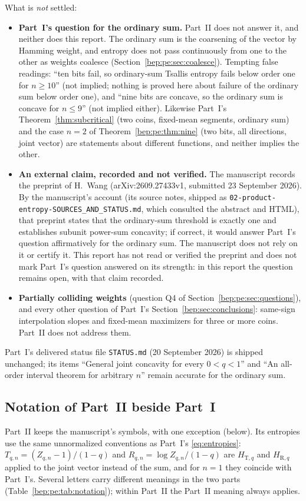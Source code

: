 \documentclass[11pt]{article}
\numberwithin{equation}{section}
\theoremstyle{definition}
\theoremstyle{remark}
\begin{document}
\noindent What is \emph{not} settled:
\begin{itemize}
\item \textbf{Part~I's question for the ordinary sum.} Part~II does not
answer it, and neither does this report. The ordinary sum is the
coarsening of the vector by Hamming weight, and entropy does not pass
continuously from one to the other as weights coalesce
(Section~\ref{bep:pe:sec:coalesce}). Tempting false readings: ``ten bits
fail, so ordinary-sum Tsallis entropy fails below order one for
$n\geq10$'' (not implied; nothing is proved here about failure of the
ordinary sum below order one), and ``nine bits are concave, so the
ordinary sum is concave for $n\leq9$'' (not implied either). Likewise
Part~I's Theorem~\ref{thm:subcritical} (two coins, fixed-mean segments,
ordinary sum) and the case $n=2$ of Theorem~\ref{bep:pe:thm:nine} (two
bits, all directions, joint vector) are statements about different
functions, and neither implies the other.
\item \textbf{An external claim, recorded and not verified.} The
manuscript records the preprint of H.~Wang \cite{bep:pe:Wang}
(arXiv:2609.27433v1, submitted 23 September 2026). By the manuscript's
account (its source notes, shipped as
\nolinkurl{02-product-entropy-SOURCES_AND_STATUS.md}, which consulted the
abstract and HTML), that preprint states that the ordinary-sum threshold
is exactly one and establishes subunit power-sum concavity; if correct, it
would answer Part~I's question affirmatively for the ordinary sum. The
manuscript does not rely on it or certify it. This report has not read or
verified the preprint and does not mark Part~I's question answered on its
strength: in this report the question remains open, with that claim
recorded.
\item \textbf{Partially colliding weights} (question Q4 of
Section~\ref{bep:pe:sec:questions}), and every other question of
Part~I's Section~\ref{bep:sec:conclusions}: same-sign interpolation slopes
and fixed-mean maximizers for three or more coins. Part~II does not
address them.
\end{itemize}
Part~I's delivered status file \nolinkurl{STATUS.md} (20 September 2026)
is shipped unchanged; its items ``General joint concavity for every
$0<q<1$'' and ``An all-order interval theorem for arbitrary $n$'' remain
accurate for the ordinary sum.

\subsection{Notation of Part~II beside Part~I}\label{bep:pe:sec:notation}
Part~II keeps the manuscript's symbols, with one exception (below). Its
entropies use the same unnormalized conventions as Part~I's
\eqref{eq:entropies}: $T_{q,n}=(Z_{q,n}-1)/(1-q)$ and
$R_{q,n}=\log Z_{q,n}/(1-q)$ are $H_{\mathrm T,q}$ and $H_{\mathrm R,q}$
applied to the joint vector instead of the sum, and for $n=1$ they
coincide with Part~I's. Several letters carry different meanings in the
two parts (Table~\ref{bep:pe:tab:notation}); within Part~II the Part~II
meaning always applies.
\end{document}
